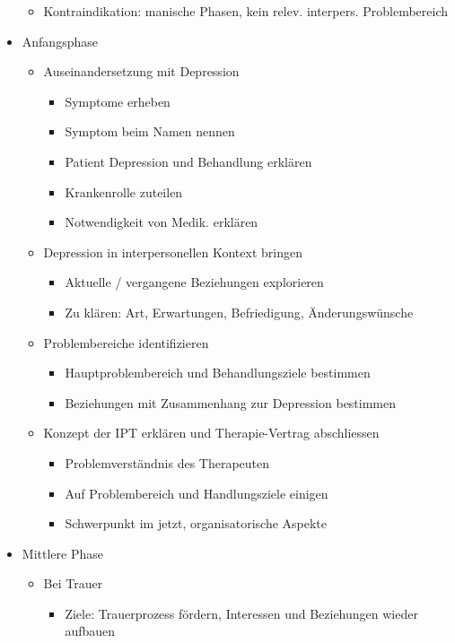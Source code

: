 \documentclass[11pt, paper=a4, twocolumn]{scrartcl}
\begin{document}
\begin{itemize}
\begin{itemize}
					\item Kontraindikation: manische Phasen, kein relev. interpers. Problembereich
				\end{itemize}
			\item Anfangsphase
				\begin{itemize}
					\item Auseinandersetzung mit Depression
						\begin{itemize}
							\item Symptome erheben
							\item Symptom beim Namen nennen
							\item Patient Depression und Behandlung erklären
							\item Krankenrolle zuteilen
							\item Notwendigkeit von Medik. erklären
						\end{itemize}
					\item Depression in interpersonellen Kontext bringen
						\begin{itemize}
							\item Aktuelle / vergangene Beziehungen explorieren 
							\item Zu klären: Art, Erwartungen, Befriedigung, Änderungswünsche
						\end{itemize}
					\item Problembereiche identifizieren
						\begin{itemize}
							\item Hauptproblembereich und Behandlungsziele bestimmen
							\item Beziehungen mit Zusammenhang zur Depression bestimmen
						\end{itemize}
					\item Konzept der IPT erklären und Therapie-Vertrag abschliessen
						\begin{itemize}
							\item Problemverständnis des Therapeuten
							\item Auf Problembereich und Handlungsziele einigen
							\item Schwerpunkt im jetzt, organisatorische Aspekte
						\end{itemize}
				\end{itemize}
			\item Mittlere Phase
				\begin{itemize}
					\item Bei Trauer
						\begin{itemize}
							\item Ziele: Trauerprozess fördern, Interessen und Beziehungen wieder aufbauen

\end{itemize}
\end{itemize}
\end{itemize}
\end{document}
